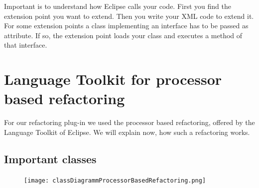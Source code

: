 \documentclass[a4paper,10pt]{report}
\begin{document}
Important is to understand how Eclipse calls your code. First you find the extension point you want to extend.
Then you write your XML code to extend it. For some extension points a class implementing an interface has to be passed as attribute.
If so, the extension point loads your class and executes a method of that interface.


\chapter{Language Toolkit for processor based refactoring}
\label{languageToolkitForProcessorBasedRefactoring}
For our refactoring plug-in we used the processor based refactoring, offered by the Language Toolkit of Eclipse.
We will explain now, how such a refactoring works.
\section{Important classes}
\label{languageToolkitClasses}
\begin{figure}[h]
\centering
\texttt{[image: classDiagrammProcessorBasedRefactoring.png]}
\end{figure}
\end{document}
